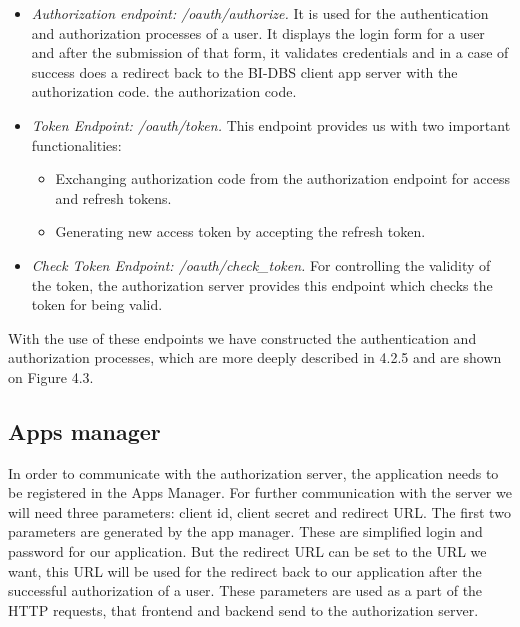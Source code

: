 \begin{itemize}
    \item \emph{Authorization endpoint: /oauth/authorize.} It is used for the authentication and authorization processes of a user. It displays the login form for a user and after the submission of that form, it validates credentials and in a case of success does a redirect back to the BI-DBS client app server with the authorization code.   
    the authorization code.
    \item \emph{Token Endpoint: /oauth/token.} This endpoint provides us with two important functionalities:
        \begin{itemize}
            \item Exchanging authorization code from the authorization endpoint for access and refresh tokens.
            \item Generating new access token by accepting the refresh token.
        \end{itemize}
   \item \emph{Check Token Endpoint: /oauth/check\_token.} For controlling the validity of the token, the authorization server provides this endpoint which checks the token for being valid.
\end{itemize}

\noindent With the use of these endpoints we have constructed the authentication and authorization processes, which are more deeply described in 4.2.5 and are shown on Figure 4.3.


\subsection{Apps manager} In order to communicate with the authorization server, the application needs to be registered in the Apps Manager. For further communication with the server we will need three parameters: client id, client secret and redirect URL. The first two parameters are generated by the app manager. These are simplified login and password for our application. But the redirect URL can be set to the URL we want, this URL will be used for the redirect back to our application after the successful authorization of a user. These parameters are used as a part of the HTTP requests, that frontend and backend send to the authorization server.

